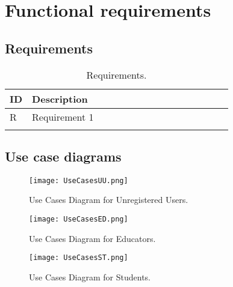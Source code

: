 \section{Functional requirements}
\label{sec:functional_requirements}%

\subsection{Requirements}
\label{subsec:requirements3}%
\setcounter{req}{1}
\newcommand{\creq}{\thereq\stepcounter{req}}
\begin{center}
    \begin{longtable}{|l|p{0.9\linewidth}|}
        \hline
        \textbf{ID} & \textbf{Description}                                                       \\
        \hline
        R\creq      & Requirement 1
        \\
        \hline
        \caption{Requirements.}
        \label{tab: req}%
    \end{longtable}
\end{center}

\subsection{Use case diagrams}
\label{subsec:use_case_diagrams}%

\begin{figure}[H]
    \begin{center}
        \texttt{[image: UseCasesUU.png]}
        \caption{Use Cases Diagram for Unregistered Users.} 
        \label{fig:UnregisteredUC}%
    \end{center}
\end{figure}

\begin{figure}[H]
    \begin{center}
        \texttt{[image: UseCasesED.png]}
        \caption{Use Cases Diagram for Educators.}
        \label{fig:EducatorUC}%
    \end{center}
\end{figure}

\begin{figure}[H]
    \begin{center}
        \texttt{[image: UseCasesST.png]}
        \caption{Use Cases Diagram for Students.}
        \label{fig:StudentUC}%
    \end{center}
\end{figure}

